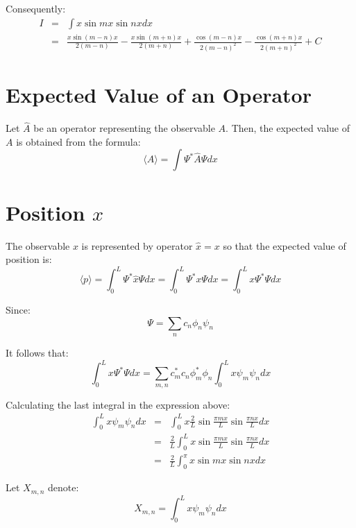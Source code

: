 \documentclass[12pt]{article}
\begin{document}
\noindent Consequently:
\begin{eqnarray*}
I &=& \int x \sin mx \sin nx dx \\
&=& \frac{x\sin(m-n) x}{2(m-n)} - \frac{x \sin(m+n)x}{2(m+n)}  + \frac{\cos(m-n)x}{2(m-n)^2}  - \frac{\cos(m+n)x}{2(m+n)^2} + C
\end{eqnarray*}



\section{Expected Value of an Operator}
Let $\hat{A}$ be an operator representing the observable $A$. Then, the expected value of $A$ is obtained from the formula:
\begin{equation}
 \langle A \rangle = \int \Psi^* \hat{A} \Psi dx
\end{equation}


\section{Position $x$}
The observable $x$ is represented by operator $\hat{x} = x$ so that the expected value of position is:
\begin{equation*}
\langle p \rangle = \int_0^L \Psi^* \hat{x} \Psi dx =  \int_0^L \Psi^* x \Psi dx =  \int_0^L x \Psi^* \Psi dx
\end{equation*}

\noindent Since:
\begin{equation*}
\Psi = \sum_n c_n \phi_n \psi_n
\end{equation*}

\noindent It follows that:
\begin{equation*}
\int_0^L x \Psi^* \Psi dx = \sum_{m,n} c^{*}_m c_n \phi^{*}_m \phi_n \int_0^L x \psi_m \psi_n dx
\end{equation*}

\noindent Calculating the last integral in the expression above:
\begin{eqnarray}
\nonumber
\int_{0}^{L} x \psi_m \psi_n dx 
&=& \int_{0}^{L} x \frac{2}{L} \sin \frac{\pi m x}{L} \sin \frac{\pi n x}{L} dx \\ \nonumber
&=& { \displaystyle \frac{2}{L}\int_{0}^{L} x \sin \frac{\pi m x}{L} \sin \frac{\pi n x}{L} dx } \\ \nonumber
&=& \displaystyle \frac{2}{L}\int_{0}^{\pi} x \sin mx \sin nx dx
\end{eqnarray}

\noindent Let $X_{m,n}$ denote: 
\begin{equation}
X_{m,n} = \int_0^L x \psi_m \psi_n dx
\end{equation}
\end{document}
